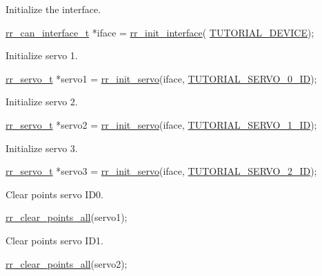 \begin{DoxyEnumerate}
\item Initialize the interface. 
\begin{DoxyCodeInclude}
    \hyperlink{structrr__can__interface__t}{rr\_can\_interface\_t} *iface = \hyperlink{group___init_ga472a4890dcc7d7a13123c56a06946d91}{rr\_init\_interface}(
      \hyperlink{tutorial_8h_a90947332a0345dc693905e3fc04dbeb2}{TUTORIAL\_DEVICE});
\end{DoxyCodeInclude}

\item Initialize servo 1. 
\begin{DoxyCodeInclude}
    \hyperlink{structrr__servo__t}{rr\_servo\_t} *servo1 = \hyperlink{group___init_ga0adb313a3eeb8a4399431e940a1f3e9e}{rr\_init\_servo}(iface, 
      \hyperlink{tutorial_8h_a9a3d33f25d3a72a8e30c885d238b3b65}{TUTORIAL\_SERVO\_0\_ID});
\end{DoxyCodeInclude}

\item Initialize servo 2. 
\begin{DoxyCodeInclude}
    \hyperlink{structrr__servo__t}{rr\_servo\_t} *servo2 = \hyperlink{group___init_ga0adb313a3eeb8a4399431e940a1f3e9e}{rr\_init\_servo}(iface, 
      \hyperlink{tutorial_8h_a525a6de936d69ba937949199d94ab568}{TUTORIAL\_SERVO\_1\_ID});
\end{DoxyCodeInclude}

\item Initialize servo 3. 
\begin{DoxyCodeInclude}
    \hyperlink{structrr__servo__t}{rr\_servo\_t} *servo3 = \hyperlink{group___init_ga0adb313a3eeb8a4399431e940a1f3e9e}{rr\_init\_servo}(iface, 
      \hyperlink{tutorial_8h_a363c977793cfbddce5486c10ef5b5a87}{TUTORIAL\_SERVO\_2\_ID});
\end{DoxyCodeInclude}

\item Clear points servo I\+D0. 
\begin{DoxyCodeInclude}
    \hyperlink{group___trajectory_ga19472cd90ae91f9b9f49edf4f52f35a2}{rr\_clear\_points\_all}(servo1);
\end{DoxyCodeInclude}

\item Clear points servo I\+D1. 
\begin{DoxyCodeInclude}
    \hyperlink{group___trajectory_ga19472cd90ae91f9b9f49edf4f52f35a2}{rr\_clear\_points\_all}(servo2);
\end{DoxyCodeInclude}


\end{DoxyEnumerate}
